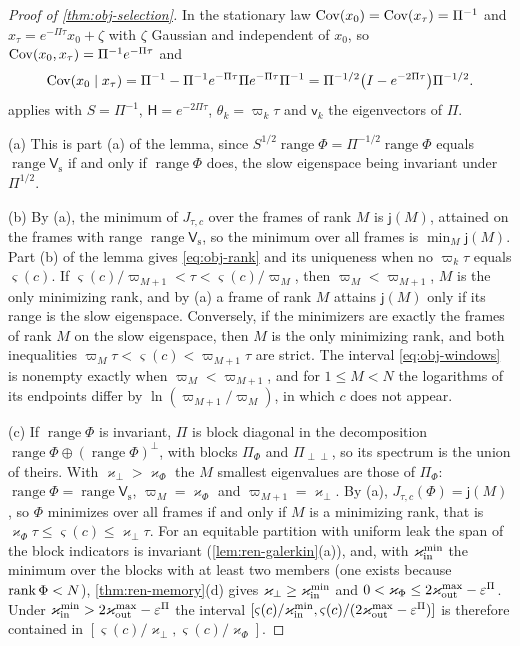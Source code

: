 \begin{proof}[Proof of \cref{thm:obj-selection}]
In the stationary law $\operatorname{Cov}(x_0)=\operatorname{Cov}(x_\tau)=\Pi^{-1}$ and $x_\tau=e^{-\Pi\tau}x_0+\zeta$ with $\zeta$ Gaussian and independent of $x_0$, so $\operatorname{Cov}(x_0,x_\tau)=\Pi^{-1}e^{-\Pi\tau}$ and
\[
\operatorname{Cov}(x_0\mid x_\tau)=\Pi^{-1}-\Pi^{-1}e^{-\Pi\tau}\Pi e^{-\Pi\tau}\Pi^{-1}=\Pi^{-1/2}\bigl(I-e^{-2\Pi\tau}\bigr)\Pi^{-1/2}.
\]
 applies with $S=\Pi^{-1}$, $\mathsf H=e^{-2\Pi\tau}$, $\theta_k=\varpi_k\tau$ and $\mathsf v_k$ the eigenvectors of $\Pi$.

(a) This is part (a) of the lemma, since $S^{1/2}\operatorname{range}\Phi=\Pi^{-1/2}\operatorname{range}\Phi$ equals $\operatorname{range}\mathsf V_{\mathrm s}$ if and only if $\operatorname{range}\Phi$ does, the slow eigenspace being invariant under $\Pi^{1/2}$.

(b) By (a), the minimum of $J_{\tau,c}$ over the frames of rank $M$ is $\mathsf j(M)$, attained on the frames with range $\operatorname{range}\mathsf V_{\mathrm s}$, so the minimum over all frames is $\min_M\mathsf j(M)$. Part (b) of the lemma gives \eqref{eq:obj-rank} and its uniqueness when no $\varpi_k\tau$ equals $\varsigma(c)$. If $\varsigma(c)/\varpi_{M+1}<\tau<\varsigma(c)/\varpi_M$, then $\varpi_M<\varpi_{M+1}$, $M$ is the only minimizing rank, and by (a) a frame of rank $M$ attains $\mathsf j(M)$ only if its range is the slow eigenspace. Conversely, if the minimizers are exactly the frames of rank $M$ on the slow eigenspace, then $M$ is the only minimizing rank, and both inequalities $\varpi_M\tau<\varsigma(c)<\varpi_{M+1}\tau$ are strict. The interval \eqref{eq:obj-windows} is nonempty exactly when $\varpi_M<\varpi_{M+1}$, and for $1\le M<N$ the logarithms of its endpoints differ by $\ln(\varpi_{M+1}/\varpi_M)$, in which $c$ does not appear.

(c) If $\operatorname{range}\Phi$ is invariant, $\Pi$ is block diagonal in the decomposition $\operatorname{range}\Phi\oplus(\operatorname{range}\Phi)^\perp$, with blocks $\Pi_\Phi$ and $\Pi_{\perp\perp}$, so its spectrum is the union of theirs. With $\varkappa_\perp>\varkappa_\Phi$ the $M$ smallest eigenvalues are those of $\Pi_\Phi$: $\operatorname{range}\Phi=\operatorname{range}\mathsf V_{\mathrm s}$, $\varpi_M=\varkappa_\Phi$ and $\varpi_{M+1}=\varkappa_\perp$. By (a), $J_{\tau,c}(\Phi)=\mathsf j(M)$, so $\Phi$ minimizes over all frames if and only if $M$ is a minimizing rank, that is $\varkappa_\Phi\tau\le\varsigma(c)\le\varkappa_\perp\tau$. For an equitable partition with uniform leak the span of the block indicators is invariant (\cref{lem:ren-galerkin}(a)), and, with $\varkappa_{\mathrm{in}}^{\min}$ the minimum over the blocks with at least two members (one exists because $\operatorname{rank}\Phi<N$), \cref{thm:ren-memory}(d) gives $\varkappa_\perp\ge\varkappa_{\mathrm{in}}^{\min}$ and $0<\varkappa_\Phi\le2\varkappa_{\mathrm{out}}^{\max}-\varepsilon^\Pi$. Under $\varkappa_{\mathrm{in}}^{\min}>2\varkappa_{\mathrm{out}}^{\max}-\varepsilon^\Pi$ the interval $[\varsigma(c)/\varkappa_{\mathrm{in}}^{\min},\varsigma(c)/(2\varkappa_{\mathrm{out}}^{\max}-\varepsilon^\Pi)]$ is therefore contained in $[\varsigma(c)/\varkappa_\perp,\varsigma(c)/\varkappa_\Phi]$.
\end{proof}

